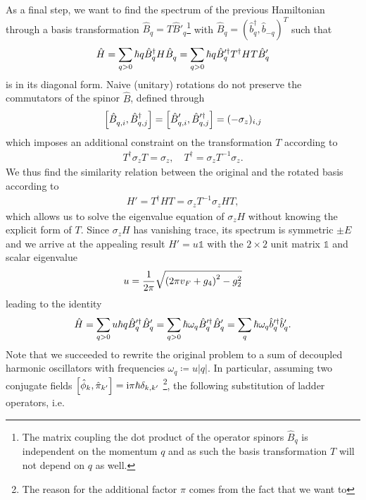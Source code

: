 As a final step, we want to find the spectrum of the previous Hamiltonian through a basis transformation $\hat B_q = T \hat B'_q$\footnote{The matrix coupling the dot product of the operator spinors $\hat B_q$ is independent on the momentum $q$ and as such the basis transformation $T$ will not depend on $q$ as well.} with $\hat B_q = (\hat b_q^\dag, \hat b_{-q})^T$ such that
\begin{align}
    \hat H = \sum_{q>0}\hbar q\hat B^\dag_q H \hat B^\pdag_q = \sum_{q>0}\hbar q\hat B'^\dag_q T^\dag H T \hat B'^\pdag_q
\end{align}
is in its diagonal form.
Naive (unitary) rotations do not preserve the commutators of the spinor $\hat B$, defined through
\begin{align}
    \commutator{\hat B_{q,i}^\pdag,\hat B^\dag_{q,j}} = \commutator{\hat B_{q,i}'^\pdag,\hat B'^\dag_{q,j}} = (-\sigma_z)_{i,j}
\end{align}
which imposes an additional constraint on the transformation $T$ according to
\begin{align}
    T^\dag\sigma_z T = \sigma_z,
    \quad
    T^\dag = \sigma_zT^{-1}\sigma_z.
\end{align}
We thus find the similarity relation between the original and the rotated basis according to
\begin{align}
    H'=T^\dag HT =\sigma_z T^{-1}\sigma_z H T,
\end{align}
which allows us to solve the eigenvalue equation of $\sigma_z H$ without knowing the explicit form of $T$.
Since $\sigma_zH$ has vanishing trace, its spectrum is symmetric $\pm E$ and we arrive at the appealing result $H' = u\mathbb1$ with the $2\times2$ unit matrix $\mathbb1$ and scalar eigenvalue
\begin{align}
    u = \frac1{2\pi}\sqrt{\left( 2\pi v_F + g_4 \right)^2 - g_2^2}
\end{align}
leading to the identity
\begin{align}
    \hat H = \sum_{q>0} u\hbar q \hat B'^\dag_q \hat B'^\pdag_q = \sum_{q>0} \hbar \omega_q \hat B'^\dag_q \hat B'^\pdag_q = \sum_q \hbar  \omega_q \hat b'^\dag_q\hat b'^\pdag_q.
\end{align}
Note that we succeeded to rewrite the original problem to a sum of decoupled harmonic oscillators with frequencies $\omega_q\coloneqq u|q|$.
In particular, assuming two conjugate fields $\left[ \hat \phi_{k},\hat \pi_{k'} \right] = \mathrm i\pi\hbar\delta_{k,k'}$
\footnote{
    The reason for the additional factor $\pi$ comes from the fact that we want to
}, the following substitution of ladder operators, i.e.
